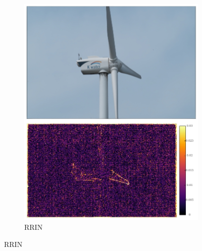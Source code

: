 \documentclass{article}
\begin{document}
\begin{figure}
\begin{subfigure}{0.25\textwidth}
    \includegraphics[width=1\linewidth]{qua_imgs/TEST02_045_f0465_rrin.jpg}
    \caption{RRIN}


\end{subfigure}
\end{figure}
\end{document}

